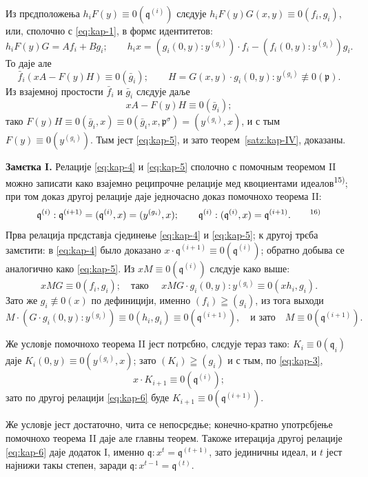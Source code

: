 \documentclass[11pt]{article}
\theoremstyle{plain}
\begin{document}
Из прєдположења $h_{i}F(y) \equiv 0(\mathfrak{q}^{(i)})$
слєдује
$h_{i}F(y)G(x,y) \equiv 0(f_{i}, g_{i})$, или, сполочно
с \eqref{eq:kap-1}, в формє идентитетов:
\[
h_{i}F(y)G = Af_{i} + Bg_{i}; \qquad
h_{i}x = (g_{i}(0,y):y^{(g_{i})})\cdot f_{i}
- (f_{i}(0,y):y^{(g_{i})})g_{i}.
\]
То даје але
\[
\bar{f}_{i}(xA - F(y)H) \equiv 0(\bar{g}_{i}); \qquad
H = G(x,y) \cdot g_{i}(0,y) : y^{(g_{i})} \not\equiv 0(\mathfrak{p}).
\]
Из взајемној простости $\bar{f}_{i}$ и $\bar{g}_{i}$ слєдује даље
\[
xA - F(y)H \equiv 0(\bar{g}_{i});
\]
тако $F(y)H \equiv 0(\bar{g}_{i}, x)
\equiv 0(\bar{g}_{i}, x, \mathfrak{p}^{\sigma})
= (y^{(g_{i})}, x)$, и с тым $F(y) \equiv 0(y^{(g_{i})})$.
Тым јест \eqref{eq:kap-5}, и зато теорем~\ref{satz:kap-IV}, доказаны.

\smallskip
\textbf{Замєтка I.} Релације \eqref{eq:kap-4} и \eqref{eq:kap-5}
сполочно с помочным теоремом II можно записати како взајемно
реципрочне релације мед квоциентами идеалов\textsuperscript{15)};
при том доказ другој релације даје једночасно доказ помочнохо
теорема II:
\begin{equation}\label{eq:kap-6}
\mathfrak{q}^{(i)} : \mathfrak{q}^{(i+1)}
= (\mathfrak{q}^{(i)}, x) = (y^{(g_{i})}, x); \qquad
\mathfrak{q}^{(i)} : (\mathfrak{q}^{(i)}, x)
= \mathfrak{q}^{(i+1)}.\qquad\text{\textsuperscript{16)}}
\end{equation}
Прва релација прєдставја сјединење \eqref{eq:kap-4} и
\eqref{eq:kap-5}; к другој трєба замєтити: в \eqref{eq:kap-4}
было доказано
$x \cdot \mathfrak{q}^{(i+1)} \equiv 0(\mathfrak{q}^{(i)})$;
обратно добыва се аналогично како \eqref{eq:kap-5}. Из
$xM \equiv 0(\mathfrak{q}^{(i)})$ слєдује како выше:
\[
xMG \equiv 0(f_{i}, g_{i}); \quad \text{тако }\quad
xMG \cdot g_{i}(0,y) : y^{(g_{i})}
\equiv 0(xh_{i}, g_{i}).
\]
Зато же $g_{i} \not\equiv 0(x)$ по дефиницији, именно
$(f_i)\geqq(g_i)$, из тога выходи
\[
M \cdot (G \cdot g_{i}(0,y) : y^{(g_{i})})
\equiv 0(h_{i}, g_{i}) \equiv 0(\mathfrak{q}^{(i+1)}),
\quad\text{и зато}\quad M \equiv 0(\mathfrak{q}^{(i+1)}).
\]

Же условје помочнохо теорема II јест потрєбно, слєдује тераз тако:
$K_i\equiv0(\mathfrak{q}_i)$ даје
$K_{i}(0,y) \equiv 0(y^{(g_{i})}, x)$; зато
$(K_i)\geqq(g_i)$ и с тым, по \eqref{eq:kap-3},
\[
x \cdot K_{i+1} \equiv 0(\mathfrak{q}^{(i)});
\]
зато по другој релацији \eqref{eq:kap-6} буде
$K_{i+1} \equiv 0(\mathfrak{q}^{(i+1)})$.

Же условје јест достаточно, чита се непосрєдње; конечно-кратно
употрєбјење помочнохо теорема II даје але главны теорем. Такоже
итерација другој релације \eqref{eq:kap-6} даје додаток I, именно
$\mathfrak{q} : x^{t} = \mathfrak{q}^{(t+1)}$, зато јединичны
идеал, и $t$ јест најнижи такы степен, заради
$\mathfrak{q} : x^{t-1} = \mathfrak{q}^{(t)}$.
\end{document}
